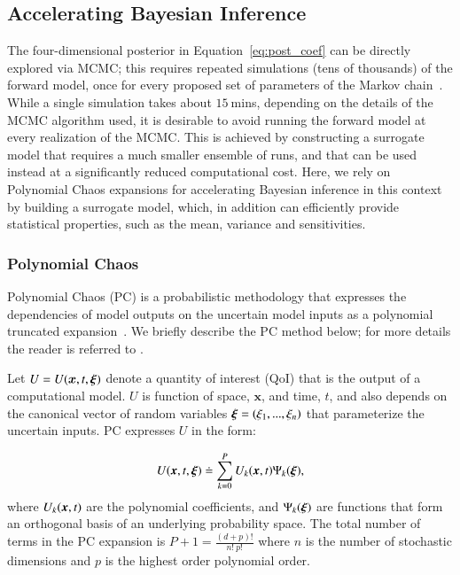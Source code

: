 \subsection{Accelerating Bayesian Inference}
\label{sec:uqpce}

The four-dimensional posterior in Equation~\eqref{eq:post_coef} can be directly
explored via MCMC; this requires repeated simulations (tens of thousands) of the forward \geoclaw model, 
once for every proposed set of parameters of the Markov chain~\cite{MarzoukNajm2009,Malinverno2002}. 
While a single \geoclaw simulation takes about $15~$mins, depending on the details of the MCMC algorithm used, 
it is desirable to avoid running the forward model at every realization of the MCMC. 
This is achieved by constructing a surrogate model that requires a much
smaller ensemble of \geoclaw runs, and that can be used instead
at a significantly reduced computational cost.  Here, we rely on
Polynomial Chaos expansions for accelerating Bayesian inference in this context 
by building a surrogate model, which, in addition can efficiently
provide statistical properties, such as the mean, variance and sensitivities. 

\subsubsection{Polynomial Chaos}

Polynomial Chaos (PC) is a probabilistic methodology that expresses the 
dependencies of model outputs on the uncertain model inputs
as a polynomial truncated expansion~\citep{Villegas2012,Lin2009,Xiu2004}.
We briefly describe the PC method below; for more details 
the reader is referred to \citep{LeMaitreKnio2010}.

Let $U=U(\bm{x},t,\xxi)$ denote a quantity of 
interest (QoI) that is the output of a computational model.
$U$ is function of space, $\bm{x}$, and time, $t$, and 
also depends on the canonical vector of random variables $\xxi=(\xi_1,...,\xi_n)$
that parameterize the uncertain inputs. 
PC expresses $U$ in the form:

\begin{equation}
  U(\xbold,t,\xxi) \doteq \sum_{k = 0}^P U_k(\xbold,t) \Psi_k(\xxi),
\label{eq:stochseries}
\end{equation} 
where $U_k(\xbold,t)$ are the polynomial coefficients, and
$\Psi_k(\xxi)$ are functions that form an orthogonal basis of an underlying probability
space. The total number of terms in the PC expansion is
$P+1 = \frac{(d+p)! }{n!\ p!}$ where $n$ is the number of stochastic dimensions and $p$ is the highest order
polynomial order. 

